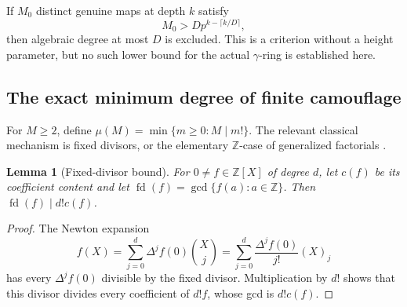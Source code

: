 \documentclass[11pt,a4paper]{article}
\newcommand{\Z}{\mathbb Z}
\newtheorem{lemma}[theorem]{Lemma}
\theoremstyle{definition}
\theoremstyle{remark}
\numberwithin{equation}{section}
\begin{document}
If \(M_0\) distinct genuine maps at depth \(k\) satisfy
\[
 M_0>D p^{k-\lceil k/D\rceil},
\]
then algebraic degree at most \(D\) is excluded. This is a criterion
without a height parameter, but no such lower bound for the actual
\(\gamma\)-ring is established here.

\subsection{The exact minimum degree of finite camouflage}

For \(M\ge2\), define \(\mu(M)=\min\{m\ge0:M\mid m!\}\). The
relevant classical mechanism is fixed divisors, or the elementary
\(\Z\)-case of generalized factorials \cite{wr:bhargava}.

\begin{lemma}[Fixed-divisor bound]\label{wr:lem-fixed-divisor}
For \(0\ne f\in\Z[X]\) of degree \(d\), let \(c(f)\) be its coefficient
content and let \(\operatorname{fd}(f)=\gcd\{f(a):a\in\Z\}\). Then
\(\operatorname{fd}(f)\mid d!c(f)\).
\end{lemma}
\begin{proof}
The Newton expansion
\[
 f(X)=\sum_{j=0}^d\Delta^jf(0)\binom Xj
     =\sum_{j=0}^d\frac{\Delta^jf(0)}{j!}(X)_j
\]
has every \(\Delta^jf(0)\) divisible by the fixed divisor. Multiplication
by \(d!\) shows that this divisor divides every coefficient of \(d!f\),
whose gcd is \(d!c(f)\).
\end{proof}
\end{document}

